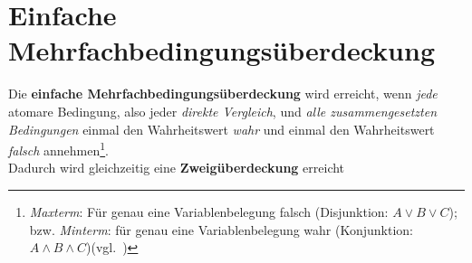 \section{Einfache Mehrfachbedingungsüberdeckung}

\begin{tcolorbox}[title=Einfache Mehrfachbedingungsüberdeckung]
    Die \textbf{einfache Mehrfachbedingungsüberdeckung} wird erreicht, wenn \textit{jede} atomare Bedingung, also jeder \textit{direkte Vergleich}, und \textit{alle zusammengesetzten Bedingungen} einmal den Wahrheitswert \textit{wahr} und einmal den Wahrheitswert \textit{falsch} annehmen\footnote{
        \textit{Maxterm}: Für genau eine Variablenbelegung falsch (Disjunktion: $A \lor B \lor C$); bzw. \textit{Minterm}: für genau eine Variablenbelegung wahr (Konjunktion: $A \land B \land C$)(vgl.~\cite[92]{Hof22})
    }.\\
    Dadurch wird gleichzeitig eine \textbf{Zweigüberdeckung} erreicht
\end{tcolorbox}